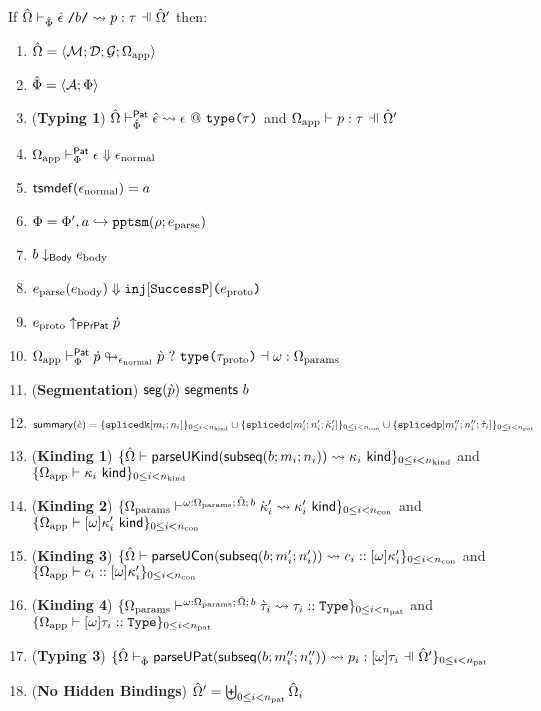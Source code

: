 \begin{theorem}
If $\patExpandsP{\uOmega'}{\uPhi}{\utsmap{\uepsilon}{b}}{p}{\tau}$ then:
\begin{enumerate}
  \item ${\hat\Omega}=\langle \mathcal{M}; \mathcal{D}; \mathcal{G}; \Omega_\text{app} \rangle$
  \item $\hat\Phi=\langle \mathcal{A}; \Phi \rangle$
  \item (\textbf{Typing 1}) ${\hat\Omega} \vdash_{\hat\Phi}^{\mathsf{Pat}} {\hat\epsilon} \leadsto \epsilon~@~\texttt{type}\texttt{(}\tau\texttt{)}$ and $\patTypePC{\Omega_\text{app}}{\uOmega'}{p}{\tau}$
  \item $\Omega_\text{app} \vdash_{\Phi}^\mathsf{Pat} \epsilon \Downarrow \epsilon_\text{normal}$
  \item $\mathsf{tsmdef}(\epsilon_\text{normal})=a$
  \item $\Phi = \Phi', a \hookrightarrow \texttt{pptsm}(\rho; e_\text{parse})$
  \item $b \downarrow_\mathsf{Body} e_\text{body}$
  \item $e_\text{parse}(e_\text{body}) \Downarrow \texttt{inj}[\mathtt{SuccessP}]\texttt{(}e_\text{proto}\texttt{)}$
  \item $e_\text{proto} \uparrow_\mathsf{PPrPat} \dot{p}$
  \item $\Omega_\text{app} \vdash_{\Phi}^\mathsf{Pat} \dot{p} \looparrowright_{\epsilon_\text{normal}} \grave{p} ~?~ \texttt{type}\texttt{(}\tau_\text{proto}\texttt{)} \dashv \omega : \Omega_\text{params}$
  \item (\textbf{Segmentation}) $\mathsf{seg}(\grave{p})~\mathsf{segments}~b$
	\item $
	\mathsf{summary}(\grave{e}) = \{\texttt{splicedk}[m_i; n_i]\}_{0 \leq i < n_\text{kind}} \cup \{\texttt{splicedc}[m'_i; n'_i; {\grave\kappa}'_i]\}_{0 \leq i < n_\text{con}} \cup\\
				     \{\texttt{splicedp}[m''_i; n''_i; \grave{\tau}_i]\}_{0 \leq i < n_\text{pat}}
	$
	\item (\textbf{Kinding 1}) $\{{\hat\Omega} \vdash \mathsf{parseUKind}(\mathsf{subseq}(b; m_i; n_i)) \leadsto \kappa_i~\mathsf{kind}\}_{0 \leq i < n_\text{kind}}$ and $\{\Omega_\text{app} \vdash \kappa_i~\mathsf{kind}\}_{0 \leq i < n_\text{kind}}$
	\item (\textbf{Kinding 2}) $\{\Omega_\text{params} \vdash^{\omega : \Omega_\text{params};\,{\hat\Omega};\,b} {\grave\kappa}'_i \leadsto \kappa'_i~\mathsf{kind}\}_{0 \leq i < n_\text{con}}$ and $\{\Omega_\text{app} \vdash [\omega]\kappa'_i~\mathsf{kind}\}_{0 \leq i < n_\text{con}}$
	\item (\textbf{Kinding 3}) $\{{\hat\Omega} \vdash \mathsf{parseUCon}(\mathsf{subseq}(b; m'_i; n'_i)) \leadsto c_i :: [\omega]\kappa'_i\}_{0 \leq i < n_\text{con}}$ and $\{\Omega_\text{app} \vdash c_i :: [\omega]\kappa'_i\}_{0 \leq i < n_\text{con}}$
	\item (\textbf{Kinding 4}) $\{\Omega_\text{params} \vdash^{\omega : \Omega_\text{params};\,{\hat\Omega};\,b} \grave{\tau}_i \leadsto \tau_i :: \texttt{Type}\}_{0 \leq i < n_\text{pat}}$ and $\{\Omega_\text{app} \vdash [\omega]\tau_i :: \texttt{Type}\}_{0 \leq i < n_\text{pat}}$
	\item (\textbf{Typing 3}) $\sseq{\patExpandsP{\uOmega'}{\uPhi}{\parseUPatF{\bsubseq{b}{m''_i}{n''_i}}}{p_i}{[\omega]\tau_i}}{\npat}$
      \item (\textbf{No Hidden Bindings}) ${\hat\Omega}' = \biguplus_{0 \leq i < n_\text{pat}} {\hat\Omega} _i$


\end{enumerate}
\end{theorem}
